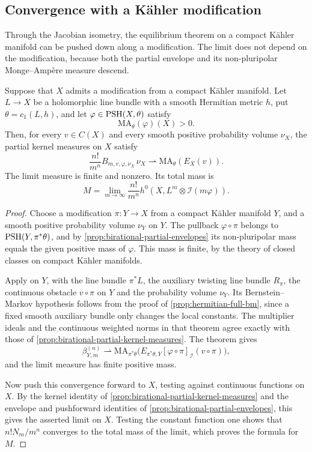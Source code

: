 \subsection{Convergence with a K\"ahler modification}

Through the Jacobian isometry, the equilibrium theorem on a compact K\"ahler manifold can be pushed down along a modification. The limit does not depend on the modification, because both the partial envelope and its non-pluripolar Monge--Amp\`ere measure descend.

\begin{theorem}\label{thm:fujiki-partial-kernel-limit}
Suppose that $X$ admits a modification from a compact K\"ahler manifold. Let $L\to X$ be a holomorphic line bundle with a smooth Hermitian metric $h$, put $\theta=c_1(L,h)$, and let $\varphi\in\mathrm{PSH}(X,\theta)$ satisfy
\[
 \mathrm{MA}_\theta(\varphi)(X)>0.
\]
Then, for every $v\in C(X)$ and every smooth positive probability volume $\nu_X$, the partial kernel measures on $X$ satisfy
\[
 \frac{n!}{m^n}B_{m,v,\varphi,\nu_X}\,\nu_X
       \rightharpoonup\mathrm{MA}_\theta(E_X(v)).
\]
The limit measure is finite and nonzero. Its total mass is
\[
 M=\lim_{m\to\infty}\frac{n!}{m^n}
                    h^0(X,L^m\otimes\mathcal I(m\varphi)).
\]
\end{theorem}
\begin{proof}
Choose a modification $\pi\colon Y\to X$ from a compact K\"ahler manifold $Y$, and a smooth positive probability volume $\nu_Y$ on $Y$. The pullback $\varphi\circ\pi$ belongs to $\mathrm{PSH}(Y,\pi^*\theta)$, and by \cref{prop:birational-partial-envelopes} its non-pluripolar mass equals the given positive mass of $\varphi$. This mass is finite, by the theory of closed classes on compact K\"ahler manifolds.

Apply \cite[Theorem~14.3.1]{SGPT} on $Y$, with the line bundle $\pi^*L$, the auxiliary twisting line bundle $R_\pi$, the continuous obstacle $v\circ\pi$ on $Y$ and the probability volume $\nu_Y$. Its Bernstein--Markov hypothesis follows from the proof of \cref{prop:hermitian-full-bm}, since a fixed smooth auxiliary bundle only changes the local constants. The multiplier ideals and the continuous weighted norms in that theorem agree exactly with those of \cref{prop:birational-partial-kernel-measures}. The theorem gives
\[
 \beta_{Y,m}^{(n)}\rightharpoonup
 \mathrm{MA}_{\pi^*\theta}
 \bigl(E_{\pi^*\theta,Y}[\varphi\circ\pi]_{\mathcal I}(v\circ\pi)\bigr),
\]
and the limit measure has finite positive mass.

Now push this convergence forward to $X$, testing against continuous functions on $X$. By the kernel identity of \cref{prop:birational-partial-kernel-measures} and the envelope and pushforward identities of \cref{prop:birational-partial-envelopes}, this gives the asserted limit on $X$. Testing the constant function one shows that $n!N_m/m^n$ converges to the total mass of the limit, which proves the formula for $M$.
\end{proof}

